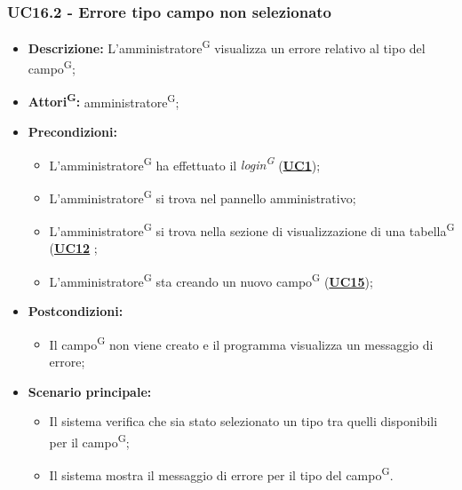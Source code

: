 \subsubsection{UC16.2 - Errore tipo campo non selezionato}
\label{sec:UC16.2}
\begin{itemize}
	\item \textbf{Descrizione:} L’amministratore\textsuperscript{G} visualizza un errore relativo al tipo del campo\textsuperscript{G};
	\item \textbf{Attori\textsuperscript{G}:} amministratore\textsuperscript{G};
	\item \textbf{Precondizioni:} 
	\begin{itemize}
		\item L’amministratore\textsuperscript{G} ha effettuato il \textit{login\textsuperscript{G}} (\hyperref[sec:UC1]{\textbf{UC1}});
		\item L’amministratore\textsuperscript{G} si trova nel pannello amministrativo;
		\item L’amministratore\textsuperscript{G} si trova nella sezione di visualizzazione di una tabella\textsuperscript{G} (\hyperref[sec:UC12]{\textbf{UC12}} ;
		\item L’amministratore\textsuperscript{G} sta creando un nuovo campo\textsuperscript{G} (\hyperref[sec:UC15]{\textbf{UC15}});
	\end{itemize}
	\item \textbf{Postcondizioni:} 
	\begin{itemize}
		\item Il campo\textsuperscript{G} non viene creato e il programma visualizza un messaggio di errore;
	\end{itemize}
	\item \textbf{Scenario principale:} 
	\begin{itemize}
		\item Il sistema verifica che sia stato selezionato un tipo tra quelli disponibili per il campo\textsuperscript{G};
		\item Il sistema mostra il messaggio di errore per il tipo del campo\textsuperscript{G}.
	\end{itemize}
\end{itemize}

